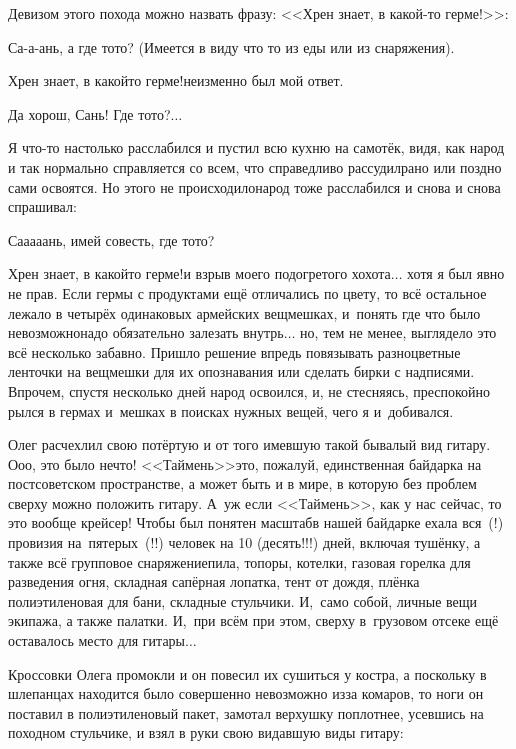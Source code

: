 Девизом этого похода можно назвать фразу: <<Хрен знает, в какой-то герме!>>:

\diagdash Са-а-ань, а где то\sdash то? (Имеется в виду что то из еды или из снаряжения). 

\diagdash Хрен знает, в какой\sdash то герме!\mdash неизменно был мой ответ. 

\diagdash Да хорош, Сань! Где то\sdash то?$\ldots$

Я что-то настолько расслабился и пустил всю кухню на самотёк, видя, как народ и так нормально справляется со всем, что справедливо рассудил\mdash рано или поздно сами освоятся. Но этого не происходило\mdash народ тоже расслабился и снова и снова спрашивал: 

\diagdash Са\sdash а\sdash а\sdash а\sdash ань, имей совесть, где то\sdash то? 

\diagdash Хрен знает, в какой\sdash то герме!\mdash и взрыв моего подогретого хохота$\ldots$ хотя я был явно не прав. Если гермы с продуктами ещё отличались по цвету, то всё остальное лежало в четырёх одинаковых армейских вещмешках, и~понять где что было невозможно\mdash надо обязательно залезать внутрь$\ldots$ но, тем не менее, выглядело это всё несколько забавно. Пришло решение впредь повязывать разноцветные ленточки на вещмешки для их опознавания или сделать бирки с надписями. Впрочем, спустя несколько дней народ освоился, и, не стесняясь, преспокойно рылся в гермах и~мешках в поисках нужных вещей, чего я и~добивался.

Олег расчехлил свою потёртую и от того имевшую такой бывалый вид гитару. О\sdash о\sdash о, это было нечто! <<Таймень>>\mdash это, пожалуй, единственная байдарка на постсоветском пространстве, а может быть и в мире, в которую без проблем сверху можно положить гитару. А~уж если <<Таймень>>, как у нас сейчас, то это вообще крейсер! Чтобы был понятен масштаб\mdash в нашей байдарке ехала вся~(!) провизия на~пятерых~(!!) человек на 10 (десять!!!) дней, включая тушёнку, а также всё групповое снаряжение\mdash пила, топоры, котелки, газовая горелка для разведения огня, складная сапёрная лопатка, тент от дождя, плёнка полиэтиленовая для бани, складные стульчики. И,~само собой, личные вещи экипажа, а также палатки. И,~при всём при этом, сверху в~грузовом отсеке ещё оставалось место для гитары$\ldots$

Кроссовки Олега промокли и он повесил их сушиться у костра, а поскольку в шлепанцах находится было совершенно невозможно из\sdash за комаров, то ноги он поставил в полиэтиленовый пакет, замотал верхушку поплотнее, усевшись на походном стульчике, и взял в руки свою видавшую виды гитару:

